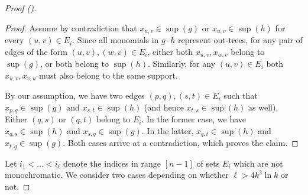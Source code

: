 \begin{proof}[Proof ()]
    \begin{proof}
        Assume by contradiction that $x_{u, v} \in \sup(g)$ or $x_{u, v} \in \sup(h)$ for every $(u, v) \in E_i$.
        Since all monomials in $g \cdot h$ represent out-trees, for any pair of edges of the form $(u, v), (w, v) \in E_i$, either both $x_{u, v}, x_{w, v}$ belong to $\sup(g)$, or both belong to $\sup(h)$. Similarly, for any $(u, v) \in E_i$ both $x_{u, v}, x_{v, u}$ must also belong to the same support.
        
        By our assumption, we have two edges $(p, q), (s, t) \in E_i$ such that $x_{p, q} \in \sup(g)$ and $x_{s, t} \in \sup(h)$ (and hence $x_{t, s} \in \sup(h)$ as well). Either $(q, s)$ or $(q, t)$ belong to $E_i$. In the former case, we have $x_{q, s} \in \sup(h)$ and $x_{s, q} \in \sup(g)$. In the latter, $x_{q, t} \in \sup(h)$ and $x_{t, q} \in \sup(g)$. Both cases arrive at a contradiction, which proves the claim.
    \end{proof}

    
    Let $i_1 < \dots < i_\ell$ denote the indices in range $[n - 1]$ of sets $E_i$ which are not monochromatic. We consider two cases depending on whether $\ell > 4k^2 \ln k$ or not.


\end{proof}

